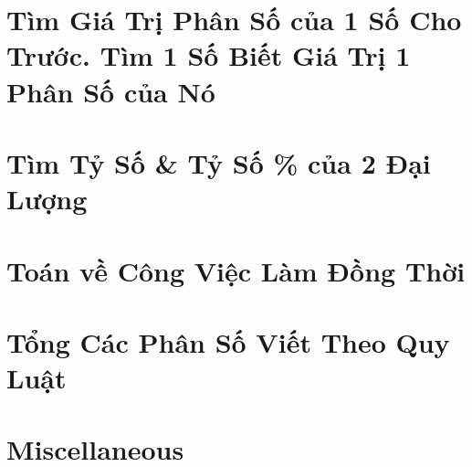 \documentclass{article}
\begin{document}

\section{Tìm Giá Trị Phân Số của 1 Số Cho Trước. Tìm 1 Số Biết Giá Trị 1 Phân Số của Nó}


\section{Tìm Tỷ Số \& Tỷ Số \% của 2 Đại Lượng}


\section{Toán về Công Việc Làm Đồng Thời}


\section{Tổng Các Phân Số Viết Theo Quy Luật}


\section{Miscellaneous}


\printbibliography[heading=bibintoc]
	
\end{document}

